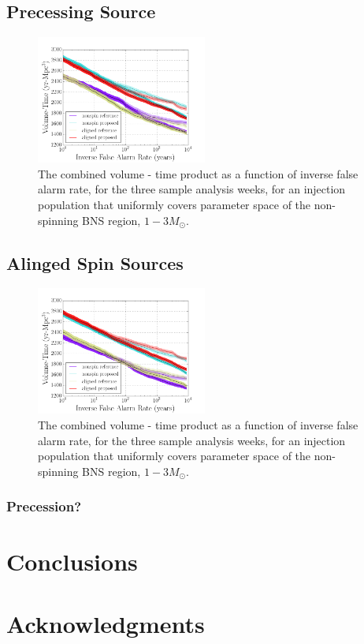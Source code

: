 \subsection{Precessing Source}

\begin{figure}
\includegraphics[width=0.5\textwidth]{papers/bns_o1_dev/figures/prec_combined.png}
\caption{\label{fig:prec} 
The combined volume - time product as a function of inverse false alarm rate, for the
three sample analysis weeks, for an injection population that uniformly covers parameter space of the non-spinning BNS region, $1- 3M_\odot$. 
}
\end{figure}

\subsection{Alinged Spin Sources}

\begin{figure}
\includegraphics[width=0.5\textwidth]{papers/bns_o1_dev/figures/aligned_combined.png}
\caption{\label{fig:aligned} 
The combined volume - time product as a function of inverse false alarm rate, for the
three sample analysis weeks, for an injection population that uniformly covers parameter space of the non-spinning BNS region, $1- 3M_\odot$. 
}
\end{figure}


\subsubsection{Precession?}


\section{Conclusions}
\label{sec:conclusions}

\section{Acknowledgments}
\label{sec:acknowledgments}
